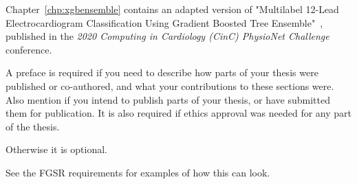 \documentclass[\main/thesis.tex]{subfiles}
\begin{document}
\begin{preface}

Chapter~\ref{chp:xgbensemble} contains an adapted version of
"Multilabel 12-Lead Electrocardiogram Classification Using Gradient Boosted Tree Ensemble"~\cite{wong2020CINC-multilabel-ECG},
published in the \emph{2020 Computing in Cardiology (CinC) PhysioNet Challenge} conference.

A preface is required if you need to describe how parts of your thesis were
published or co-authored, and what your contributions to these sections were.
Also mention if you intend to publish parts of your thesis,
or have submitted them for publication. 
It is also required if ethics approval was needed for any part of the thesis.

Otherwise it is optional.

See the FGSR requirements for examples of how this can look.
\end{preface}
\end{document}
